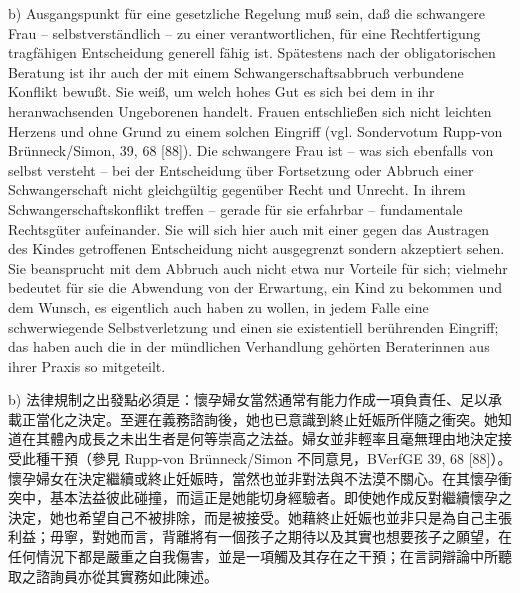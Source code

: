 \documentclass[12pt]{article}
\begin{document}
\begin{sourcepara}[title={原文SondervotumMS.295}]
b) Ausgangspunkt für eine gesetzliche Regelung muß sein, daß die schwangere Frau -- selbstverständlich -- zu einer verantwortlichen, für eine Rechtfertigung tragfähigen Entscheidung generell fähig ist. Spätestens nach der obligatorischen Beratung ist ihr auch der mit einem Schwangerschaftsabbruch verbundene Konflikt bewußt. Sie weiß, um welch hohes Gut es sich bei dem in ihr heranwachsenden Ungeborenen handelt. Frauen entschließen sich nicht leichten Herzens und ohne Grund zu einem solchen Eingriff (vgl. Sondervotum Rupp-von Brünneck/Simon, \abbrBVerfGE{} 39, 68 [88]). Die schwangere Frau ist -- was sich ebenfalls von selbst versteht -- bei der Entscheidung über Fortsetzung oder Abbruch einer Schwangerschaft nicht gleichgültig gegenüber Recht und Unrecht. In ihrem Schwangerschaftskonflikt treffen -- gerade für sie erfahrbar -- fundamentale Rechtsgüter aufeinander. Sie will sich hier auch mit einer gegen das Austragen des Kindes getroffenen Entscheidung nicht ausgegrenzt sondern akzeptiert sehen. Sie beansprucht mit dem Abbruch auch nicht etwa nur Vorteile für sich; vielmehr bedeutet für sie die Abwendung von der Erwartung, ein Kind zu bekommen und dem Wunsch, es eigentlich auch haben zu wollen, in jedem Falle eine schwerwiegende Selbstverletzung und einen sie existentiell berührenden Eingriff; das haben auch die in der mündlichen Verhandlung gehörten Beraterinnen aus ihrer Praxis so mitgeteilt.
\end{sourcepara}
\begin{transpara}
b) 法律規制之出發點必須是：懷孕婦女當然通常有能力作成一項負責任、足以承載正當化之決定。至遲在義務諮詢後，她也已意識到終止妊娠所伴隨之衝突。她知道在其體內成長之未出生者是何等崇高之法益。婦女並非輕率且毫無理由地決定接受此種干預（參見 Rupp-von Brünneck/Simon 不同意見，BVerfGE 39, 68 [88]）。懷孕婦女在決定繼續或終止妊娠時，當然也並非對法與不法漠不關心。在其懷孕衝突中，基本法益彼此碰撞，而這正是她能切身經驗者。即使她作成反對繼續懷孕之決定，她也希望自己不被排除，而是被接受。她藉終止妊娠也並非只是為自己主張利益；毋寧，對她而言，背離將有一個孩子之期待以及其實也想要孩子之願望，在任何情況下都是嚴重之自我傷害，並是一項觸及其存在之干預；在言詞辯論中所聽取之諮詢員亦從其實務如此陳述。
\end{transpara}
\end{document}

